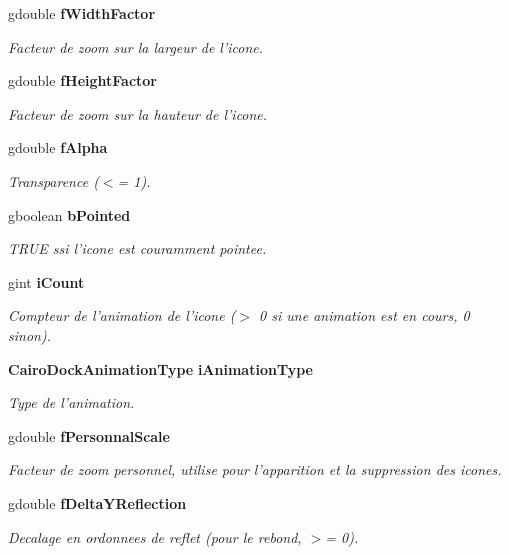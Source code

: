 \begin{CompactItemize}
gdouble {\bf fWidthFactor}
\begin{CompactList}\small\item\em Facteur de zoom sur la largeur de l'icone. \item\end{CompactList}\item 
gdouble {\bf fHeightFactor}
\begin{CompactList}\small\item\em Facteur de zoom sur la hauteur de l'icone. \item\end{CompactList}\item 
gdouble {\bf fAlpha}
\begin{CompactList}\small\item\em Transparence ($<$= 1). \item\end{CompactList}\item 
gboolean {\bf bPointed}
\begin{CompactList}\small\item\em TRUE ssi l'icone est couramment pointee. \item\end{CompactList}\item 
gint {\bf iCount}
\begin{CompactList}\small\item\em Compteur de l'animation de l'icone ($>$ 0 si une animation est en cours, 0 sinon). \item\end{CompactList}\item 
{\bf CairoDockAnimationType} {\bf iAnimationType}
\begin{CompactList}\small\item\em Type de l'animation. \item\end{CompactList}\item 
gdouble {\bf fPersonnalScale}
\begin{CompactList}\small\item\em Facteur de zoom personnel, utilise pour l'apparition et la suppression des icones. \item\end{CompactList}\item 
gdouble {\bf fDeltaYReflection}
\begin{CompactList}\small\item\em Decalage en ordonnees de reflet (pour le rebond, $>$= 0). \item\end{CompactList}\item 

\end{CompactItemize}
